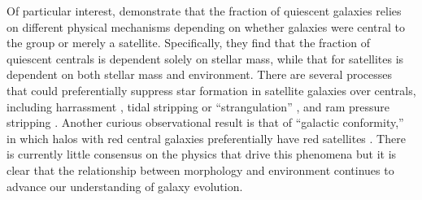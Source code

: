 Of particular interest, \cite{Peng2010} demonstrate that the fraction of quiescent galaxies relies on different physical mechanisms depending on whether galaxies were central to the group or merely a satellite. Specifically, they find that the fraction of quiescent centrals is dependent solely on stellar mass, while that for satellites is dependent on both stellar mass and environment.  There are several processes that could preferentially suppress star formation in satellite galaxies over centrals, including harrassment \citep{Moore1996}, tidal stripping or ``strangulation'' \citep{Kawata2008}, and ram pressure stripping \citep{Gunn1972}. Another curious observational result is that of ``galactic conformity,'' in which halos with red central galaxies preferentially have red satellites \citep{Weinmann2006}. There is currently little consensus on the physics that drive this phenomena \citep{Kauffmann2013,Hearin2015,Hearin2016,Pahwa2017} but it is clear that the relationship between morphology and environment continues to advance our understanding of galaxy evolution.







